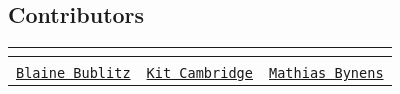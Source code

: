 \subsection*{Contributors}

\tabulinesep=1mm
\begin{longtabu} spread 0pt [c]{*{3}{|X[-1]}|}
\hline
\rowcolor{\tableheadbgcolor}\textbf{ \href{http://twitter.com/blainebublitz}{\tt } }&\textbf{ \href{https://twitter.com/kitcambridge}{\tt } }&\textbf{ \href{http://twitter.com/mathias}{\tt }  }\\
\endfirsthead
\hline
\endfoot
\hline
\rowcolor{\tableheadbgcolor}\textbf{ \href{http://twitter.com/blainebublitz}{\tt } }&\textbf{ \href{https://twitter.com/kitcambridge}{\tt } }&\textbf{ \href{http://twitter.com/mathias}{\tt }  }\\
\endhead
\href{http://iceddev.com/}{\tt Blaine Bublitz} &\href{http://kitcambridge.github.io/}{\tt Kit Cambridge} &\href{http://mathiasbynens.be/}{\tt Mathias Bynens} \\
\end{longtabu}
